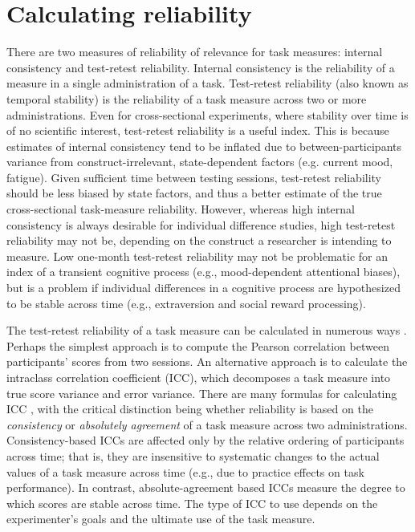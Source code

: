 \documentclass[a4paper,notitlepage,12pt]{article}
\begin{document}
\section{Calculating reliability}

There are two measures of reliability of relevance for task measures: internal consistency and test-retest reliability. Internal consistency is the reliability of a measure in a single administration of a task. Test-retest reliability (also known as temporal stability) is the reliability of a task measure across two or more administrations. Even for cross-sectional experiments, where stability over time is of no scientific interest, test-retest reliability is a useful index. This is because estimates of internal consistency tend to be inflated due to between-participants variance from construct-irrelevant, state-dependent factors (e.g. current mood, fatigue). Given sufficient time between testing sessions, test-retest reliability should be less biased by state factors, and thus a better estimate of the true cross-sectional task-measure reliability. However, whereas high internal consistency is always desirable for individual difference studies, high test-retest reliability may not be, depending on the construct a researcher is intending to measure. Low one-month test-retest reliability may not be problematic for an index of a transient cognitive process (e.g., mood-dependent attentional biases), but is a problem if individual differences in a cognitive process are hypothesized to be stable across time (e.g., extraversion and social reward processing).

The test-retest reliability of a task measure can be calculated in numerous ways \cite{Parsons2019-jw}. Perhaps the simplest approach is to compute the Pearson correlation between participants' scores from two sessions. An alternative approach is to calculate the intraclass correlation coefficient (ICC), which decomposes a task measure into true score variance and error variance. There are many formulas for calculating ICC \cite{Koo2016-fz}, with the critical distinction being whether reliability is based on the \textit{consistency} or \textit{absolutely agreement} of a task measure across two administrations. Consistency-based ICCs are affected only by the relative ordering of participants across time; that is, they are insensitive to systematic changes to the actual values of a task measure across time (e.g., due to practice effects on task performance). In contrast, absolute-agreement based ICCs measure the degree to which scores are stable across time. The type of ICC to use depends on the experimenter's goals and the ultimate use of the task measure. %
\end{document}
